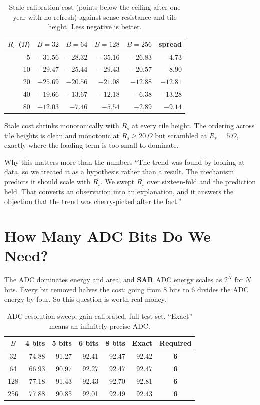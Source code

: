 \documentclass[11pt,a4paper]{report}
\newcommand{\jargon}[1]{\textcolor{acc}{\textbf{#1}}}
\begin{document}
\begin{table}[h]
\centering
\caption{Stale-calibration cost (points below the ceiling after one year with
no refresh) against sense resistance and tile height. Less negative is better.}
\begin{tabular}{rrrrrr}
\toprule
$R_s$ ($\Omega$) & $B{=}32$ & $B{=}64$ & $B{=}128$ & $B{=}256$ & spread \\
\midrule
5  & $-31.56$ & $-28.32$ & $-35.16$ & $-26.83$ & $-4.73$ \\
10 & $-29.47$ & $-25.44$ & $-29.43$ & $-20.57$ & $-8.90$ \\
20 & $-25.69$ & $-20.56$ & $-21.08$ & $-12.88$ & $-12.81$ \\
40 & $-19.66$ & $-13.67$ & $-12.18$ & $-6.38$ & $-13.28$ \\
80 & $-12.03$ & $-7.46$ & $-5.54$ & $-2.89$ & $-9.14$ \\
\bottomrule
\end{tabular}
\end{table}

Stale cost shrinks monotonically with $R_s$ at every tile height. The ordering
across tile heights is clean and monotonic at $R_s \geq 20\,\Omega$ but
scrambled at $R_s = 5\,\Omega$, exactly where the loading term is too small to
dominate.

\begin{saybox}{Why this matters more than the numbers}
``The trend was found by looking at data, so we treated it as a hypothesis
rather than a result. The mechanism predicts it should scale with $R_s$. We
swept $R_s$ over sixteen-fold and the prediction held. That converts an
observation into an explanation, and it answers the objection that the trend
was cherry-picked after the fact.''
\end{saybox}

\chapter{How Many ADC Bits Do We Need?}

The ADC dominates energy and area, and \jargon{SAR} ADC energy scales as
$2^N$ for $N$ bits. Every bit removed halves the cost; going from 8 bits to 6
divides the ADC energy by four. So this question is worth real money.

\begin{table}[h]
\centering
\caption{ADC resolution sweep, gain-calibrated, full test set. ``Exact'' means
an infinitely precise ADC.}
\begin{tabular}{crrrrrc}
\toprule
$B$ & 4 bits & 5 bits & 6 bits & 8 bits & Exact & Required \\
\midrule
32  & 74.88 & 91.27 & 92.41 & 92.47 & 92.42 & \textbf{6} \\
64  & 66.93 & 90.97 & 92.27 & 92.47 & 92.47 & \textbf{6} \\
128 & 77.18 & 91.43 & 92.43 & 92.70 & 92.81 & \textbf{6} \\
256 & 77.88 & 90.85 & 92.01 & 92.49 & 92.43 & \textbf{6} \\
\bottomrule
\end{tabular}
\end{table}
\end{document}
